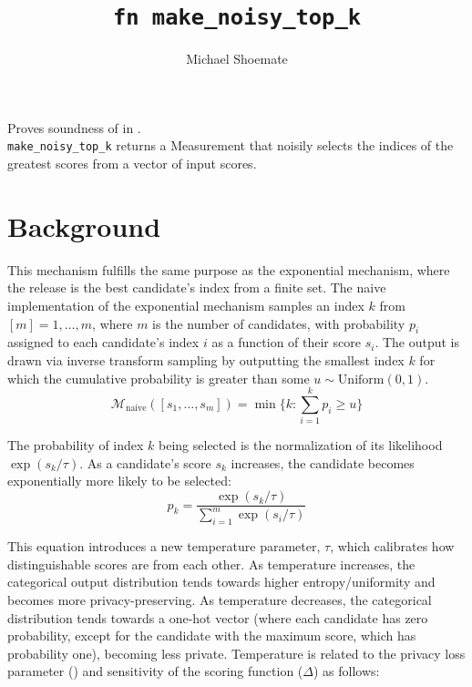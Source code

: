\documentclass{article}
\title{\texttt{fn make\_noisy\_top\_k}}
\author{Michael Shoemate}
\begin{document}
\maketitle

Proves soundness of 
in .\\
\texttt{make\_noisy\_top\_k} returns a Measurement that
noisily selects the indices of the greatest scores from a vector of input scores.

\section{Background}
This mechanism fulfills the same purpose as the exponential mechanism,
where the release is the best candidate's index from a finite set.
The naive implementation of the exponential mechanism samples an index $k$ from $[m] = {1, \ldots, m}$,
where $m$ is the number of candidates,
with probability $p_i$ assigned to each candidate's index $i$ as a function of their score $s_i$.
The output is drawn via inverse transform sampling
by outputting the smallest index $k$ for which the cumulative probability is greater than some $u \sim \mathrm{Uniform}(0, 1)$.
\begin{equation}
    \label{m-naive}
    \mathcal{M}_{\mathrm{naive}}([s_1, \ldots, s_m]) = \min \{k: \sum_{i=1}^k p_i \ge u \}
\end{equation}

The probability of index $k$ being selected is the normalization of its likelihood $\exp(s_k / \tau)$.
As a candidate's score $s_k$ increases, the candidate becomes exponentially more likely to be selected:
\begin{equation}
    \label{prob-of-k}
    p_k = \frac{\exp(s_k / \tau)}{\sum_{i = 1}^m \exp(s_i / \tau)}
\end{equation}

This equation introduces a new temperature parameter, $\tau$,
which calibrates how distinguishable scores are from each other.
As temperature increases, the categorical output distribution tends towards higher entropy/uniformity and becomes more privacy-preserving.
As temperature decreases, the categorical distribution tends towards a one-hot vector
(where each candidate has zero probability, except for the candidate with the maximum score, which has probability one),
becoming less private.
Temperature is related to the privacy loss parameter (\dout) and sensitivity of the scoring function ($\Delta$) as follows:
\end{document}

